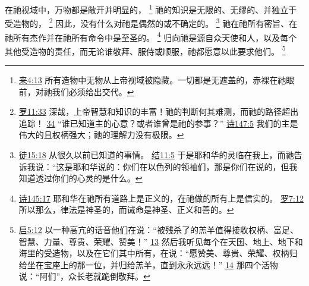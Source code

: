 \documentclass[12pt, a4paper, oneside]{ctexart}
\begin{document}
	在祂视域中，万物都是敞开并明显的，
	\footnote {
		\href{https://biblehub.com/hebrews/4-13.htm}{来4:13} 所有造物中无物从上帝视域被隐藏。一切都是无遮盖的，赤裸在祂眼前，对祂我们必须给出交代。
	}
	祂的知识是无限的、无缪的、并独立于受造物的，
	\footnote {
		\href{https://biblehub.com/romans/11-33.htm}{罗11:33} 深哉，上帝智慧和知识的丰富！祂的判断何其难测，而祂的路径超出追踪！
		\href{https://biblehub.com/romans/11-34.htm}{34} “谁已知道主的心意？或者谁曾是祂的参事？”
		\href{https://biblehub.com/psalms/147-5.htm}{诗147:5} 我们的主是伟大的且权柄强大；祂的理解力没有极限。
	}
	因此，没有什么对祂是偶然的或不确定的。
	\footnote {
		\href{https://biblehub.com/acts/15-18.htm}{徒15:18} 从很久以前已知道的事情。
		\href{https://biblehub.com/ezekiel/11-5.htm}{结11:5} 于是耶和华的灵临在我上，而祂告诉我说：“这是耶和华说的：你们在以色列的领袖们，那是你们在说的，但我知道透过你们的心灵的是什么。
	}
	祂在祂所有密旨、在祂所有杰作并在祂所有命令中是至圣的。
	\footnote {
		\href{https://biblehub.com/psalms/145-17.htm}{诗145:17} 耶和华在祂所有道路上是正义的，在祂做的所有上是信实的。
		\href{https://biblehub.com/romans/7-12.htm}{罗7:12} 所以那么，律法是神圣的，而诫命是神圣、正义和善的。
	}
	归向祂是源自众天使和人，以及每个其他受造物的责任，而无论谁敬拜、服侍或顺服，祂都愿意以此要求他们。
	\footnote {
		\href{https://biblehub.com/revelation/5-12.htm}{启5:12} 以一种高亢的话音他们在说：“被残杀了的羔羊值得接收权柄、富足、智慧、力量、尊贵、荣耀、赞美！”
		\href{https://biblehub.com/revelation/5-13.htm}{13} 然后我听见每个在天国、地上、地下和海里的受造物，以及在它们其中所有，在说：“愿赞美、尊贵、荣耀、权柄归给坐在宝座上的那一位，并归给羔羊，直到永永远远！”
		\href{https://biblehub.com/revelation/5-14.htm}{14} 那四个活物说：“阿们”，众长老就跪倒敬拜。
	}
	
\end{document}
